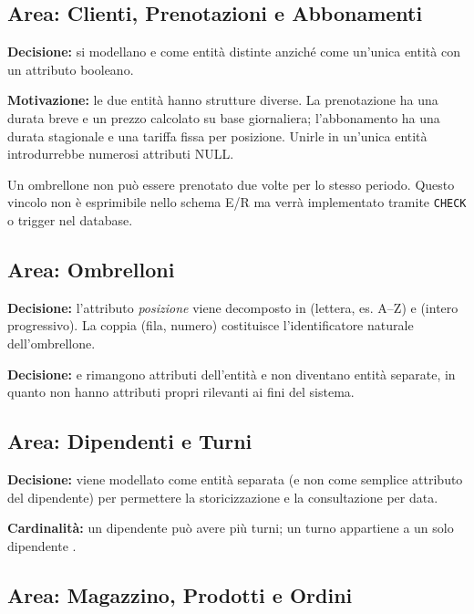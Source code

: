 \subsection{Area: Clienti, Prenotazioni e Abbonamenti}

\textbf{Decisione:} si modellano  e 
come entit\`{a} distinte anzich\'e come un'unica entit\`{a} con un attributo booleano.

\textbf{Motivazione:} le due entit\`{a} hanno strutture diverse. La prenotazione ha
una durata breve e un prezzo calcolato su base giornaliera; l'abbonamento ha una
durata stagionale e una tariffa fissa per posizione. Unirle in un'unica entit\`{a}
introdurrebbe numerosi attributi NULL.

\begin{notabox}
Un ombrellone non pu\`{o} essere prenotato due volte per lo stesso periodo. Questo
vincolo non \`{e} esprimibile nello schema E/R ma verr\`{a} implementato tramite
\texttt{CHECK} o trigger nel database.
\end{notabox}

\subsection{Area: Ombrelloni}

\textbf{Decisione:} l'attributo \textit{posizione} viene decomposto in
 (lettera, es. A--Z) e  (intero progressivo).
La coppia (fila, numero) costituisce l'identificatore naturale dell'ombrellone.

\textbf{Decisione:}  e  rimangono
attributi dell'entit\`{a}  e non diventano entit\`{a} separate, in
quanto non hanno attributi propri rilevanti ai fini del sistema.

\subsection{Area: Dipendenti e Turni}

\textbf{Decisione:}  viene modellato come entit\`{a} separata (e non
come semplice attributo del dipendente) per permettere la storicizzazione e la
consultazione per data.

\textbf{Cardinalit\`{a}:} un dipendente pu\`{o} avere pi\`{u} turni; un turno appartiene a
un solo dipendente .

\subsection{Area: Magazzino, Prodotti e Ordini}

